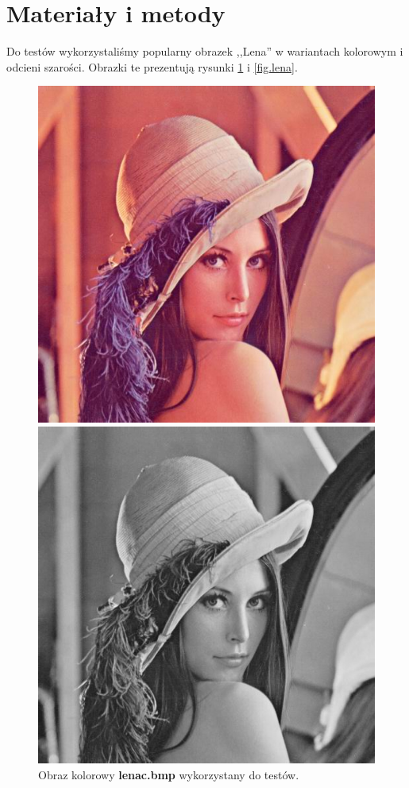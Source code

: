 \documentclass{classrep}
\begin{document}
\section{Materiały i metody}
Do testów wykorzystaliśmy popularny obrazek ,,Lena'' w wariantach kolorowym i odcieni szarości. Obrazki te prezentują rysunki \ref{fig.lenac} i \ref{fig.lena}.

\begin{figure}
  \begin{minipage}{0.5\linewidth}
    \centering
    \includegraphics[scale=0.4]{img/lenac.png}
    \caption{Obraz kolorowy \textbf{lenac.bmp} wykorzystany do testów.}
    \label{fig.lenac}
  \end{minipage}
  \hspace{0.5cm}
  \begin{minipage}{0.5\linewidth}
    \centering
    \includegraphics[scale=0.4]{img/lena.png}

\end{minipage}
\end{figure}
\end{document}
